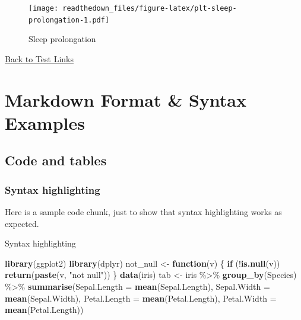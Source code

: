 \documentclass[
]{article}
\newenvironment{Shaded}{\begin{snugshade}}{\end{snugshade}}
\newcommand{\ControlFlowTok}[1]{\textcolor[rgb]{0.12,0.11,0.11}{\textbf{#1}}}
\newcommand{\DataTypeTok}[1]{\textcolor[rgb]{0.00,0.34,0.68}{#1}}
\newcommand{\KeywordTok}[1]{\textcolor[rgb]{0.12,0.11,0.11}{\textbf{#1}}}
\newcommand{\NormalTok}[1]{\textcolor[rgb]{0.12,0.11,0.11}{#1}}
\newcommand{\OperatorTok}[1]{\textcolor[rgb]{0.12,0.11,0.11}{#1}}
\newcommand{\StringTok}[1]{\textcolor[rgb]{0.75,0.01,0.01}{#1}}
\begin{document}
\begin{figure}
\centering
\texttt{[image: readthedown\_files/figure-latex/plt-sleep-prolongation-1.pdf]}
\caption{Sleep prolongation}
\end{figure}

\protect\hyperlink{sec:test}{Back to Test Links}

\hypertarget{markdown-format-syntax-examples}{%
\section{Markdown Format \& Syntax
Examples}\label{markdown-format-syntax-examples}}

\hypertarget{code-and-tables}{%
\subsection{Code and tables}\label{code-and-tables}}

\hypertarget{syntax-highlighting}{%
\subsubsection{Syntax highlighting}\label{syntax-highlighting}}

Here is a sample code chunk, just to show that syntax highlighting works
as expected.

\begin{codelisting}

\caption{Syntax highlighting}

\hypertarget{lst:syntax_highlighting}{%
\label{lst:syntax_highlighting}}%
\begin{Shaded}
\begin{Highlighting}[]
\KeywordTok{library}\NormalTok{(ggplot2)}
\KeywordTok{library}\NormalTok{(dplyr)}
\NormalTok{not\_null \textless{}{-}}\StringTok{ }\ControlFlowTok{function}\NormalTok{(v) \{}
    \ControlFlowTok{if}\NormalTok{ (}\OperatorTok{!}\KeywordTok{is.null}\NormalTok{(v)) }
        \KeywordTok{return}\NormalTok{(}\KeywordTok{paste}\NormalTok{(v, }\StringTok{"not null"}\NormalTok{))}
\NormalTok{\}}
\KeywordTok{data}\NormalTok{(iris)}
\NormalTok{tab \textless{}{-}}\StringTok{ }\NormalTok{iris }\OperatorTok{\%\textgreater{}\%}\StringTok{ }\KeywordTok{group\_by}\NormalTok{(Species) }\OperatorTok{\%\textgreater{}\%}\StringTok{ }\KeywordTok{summarise}\NormalTok{(}\DataTypeTok{Sepal.Length =} \KeywordTok{mean}\NormalTok{(Sepal.Length), }
    \DataTypeTok{Sepal.Width =} \KeywordTok{mean}\NormalTok{(Sepal.Width), }\DataTypeTok{Petal.Length =} \KeywordTok{mean}\NormalTok{(Petal.Length), }\DataTypeTok{Petal.Width =} \KeywordTok{mean}\NormalTok{(Petal.Length))}
\end{Highlighting}
\end{Shaded}

\end{codelisting}
\end{document}
